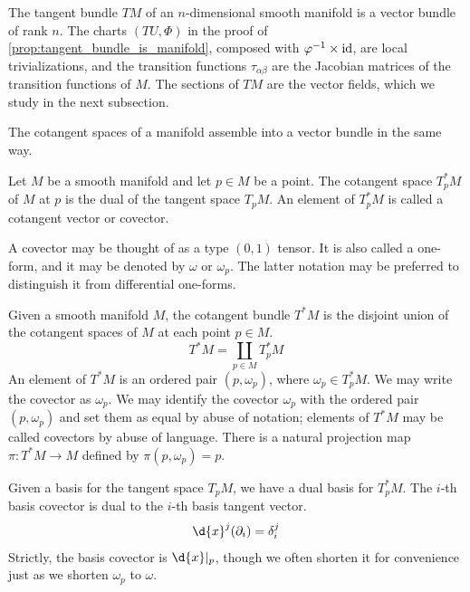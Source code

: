 \documentclass[a4paper,12pt]{article}
\begin{document}
\begin{example}\label{ex:tangent_bundle_is_a_vector_bundle}
    The tangent bundle $TM$ of an $n$-dimensional smooth manifold is a vector bundle of rank $n$.
    The charts $(TU, \Phi)$ in the proof of \cref{prop:tangent_bundle_is_manifold}, composed with $\varphi^{-1} \times \operatorname{id}$, are local trivializations, and the transition functions $\tau_{\alpha\beta}$ are the Jacobian matrices of the transition functions of $M$.
    The sections of $TM$ are the vector fields, which we study in the next subsection.
\end{example}
The cotangent spaces of a manifold assemble into a vector bundle in the same way.
\begin{definition}
    Let $M$ be a smooth manifold and let $p \in M$ be a point.
    The cotangent space $T^*_p M$ of $M$ at $p$ is the dual of the tangent space $T_p M$.
    An element of $T^*_p M$ is called a cotangent vector or covector.
\end{definition}
\begin{remark}
    A covector may be thought of as a type $(0, 1)$ tensor.
    It is also called a one-form, and it may be denoted by $\omega$ or $\omega_p$.
    The latter notation may be preferred to distinguish it from differential one-forms.
\end{remark}
\begin{definition}
    Given a smooth manifold $M$, the cotangent bundle $T^*M$ is the disjoint union of the cotangent spaces of $M$ at each point $p \in M$.
    \begin{equation}
        T^*M = \coprod_{p \in M} T^*_p M
    \end{equation}
    An element of $T^*M$ is an ordered pair $(p, \omega_p)$, where $\omega_p \in T^*_p M$. We may write the covector as $\omega_p$.
    We may identify the covector $\omega_p$ with the ordered pair $(p, \omega_p)$ and set them as equal by abuse of notation; elements of $T^*M$ may be called covectors by abuse of language.
    There is a natural projection map $\pi \colon T^*M \to M$ defined by $\pi(p, \omega_p) = p$.
\end{definition}
Given a basis for the tangent space $T_p M$, we have a dual basis for $T^*_p M$.
The $i$-th basis covector is dual to the $i$-th basis tangent vector.
\begin{equation}
    \d{x}^j(\partial_i) = \delta^j_i
\end{equation}
Strictly, the basis covector is $\eval*{\d{x}}{p}$, though we often shorten it for convenience just as we shorten $\omega_p$ to $\omega$.
\end{document}
